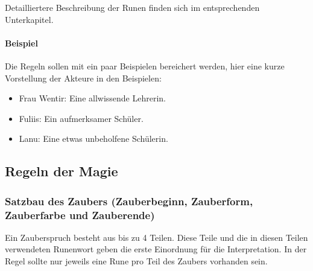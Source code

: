 \documentclass{article}
\begin{document}
Detailliertere Beschreibung der Runen finden sich im entsprechenden Unterkapitel.

\paragraph{Beispiel}

Die Regeln sollen mit ein paar Beispielen bereichert werden, hier eine kurze Vorstellung der Akteure in den Beispielen:

\begin{itemize}
\item Frau Wentir: Eine allwissende Lehrerin.
\item Fuliis: Ein aufmerksamer Schüler.
\item Lanu: Eine etwas unbeholfene Schülerin.
\end{itemize}

\begin{center}
\subsection{Regeln der Magie}
\end{center}

\subsubsection{Satzbau des Zaubers (Zauberbeginn, Zauberform, Zauberfarbe und Zauberende)}

Ein Zauberspruch besteht aus bis zu 4 Teilen. Diese Teile und die in diesen Teilen verwendeten Runenwort geben die erste
Einordnung für die Interpretation. In der Regel sollte nur jeweils eine Rune pro Teil des Zaubers vorhanden sein.
\end{document}
